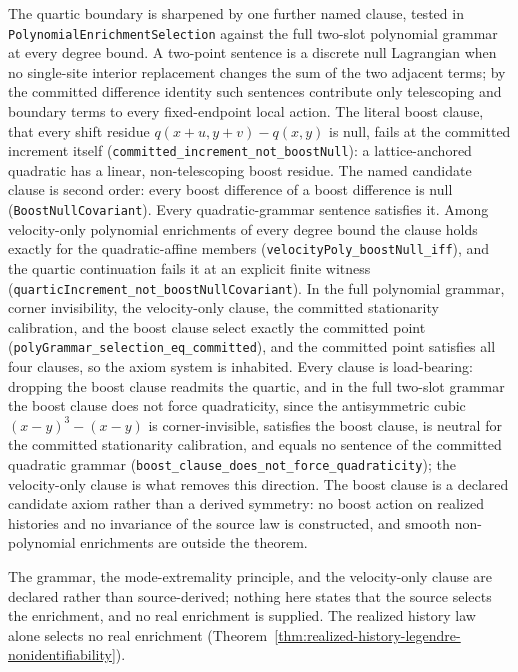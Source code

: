 \documentclass[11pt]{article}
\begin{document}
The quartic boundary is sharpened by one further named clause, tested in
\texttt{Polynomial\-Enrichment\-Selection} against the
full two-slot polynomial grammar at every degree bound. A two-point sentence is
a discrete null Lagrangian when no single-site interior replacement
changes the sum of the two adjacent terms; by the committed difference
identity such sentences contribute only telescoping and boundary terms to
every fixed-endpoint local action. The literal boost clause, that every
shift residue \(q(x+u,y+v)-q(x,y)\) is null, fails at the committed
increment itself (\texttt{committed\_increment\_not\_boostNull}): a
lattice-anchored quadratic has a linear, non-telescoping boost residue.
The named candidate clause is second order: every boost difference of a
boost difference is null (\texttt{BoostNullCovariant}). Every
quadratic-grammar sentence satisfies it. Among velocity-only polynomial
enrichments of every degree bound the clause holds exactly for the
quadratic-affine members (\texttt{velocityPoly\_boostNull\_iff}), and the
quartic continuation fails it at an explicit finite witness
(\texttt{quarticIncrement\_not\_boostNullCovariant}). In the full
polynomial grammar, corner invisibility, the velocity-only clause, the
committed stationarity calibration, and the boost clause select exactly
the committed point (\texttt{polyGrammar\_selection\_eq\_committed}), and
the committed point satisfies all four clauses, so the axiom system is
inhabited. Every clause is load-bearing: dropping the boost clause
readmits the quartic, and in the full two-slot grammar the boost clause
does not force quadraticity, since the antisymmetric cubic
\((x-y)^3-(x-y)\) is corner-invisible, satisfies the boost clause, is
neutral for the committed stationarity calibration, and equals no
sentence of the committed quadratic grammar
(\texttt{boost\_clause\_does\_not\_force\_quadraticity}); the
velocity-only clause is what removes this direction. The boost clause is
a declared candidate axiom rather than a derived symmetry: no boost action on realized histories and no invariance
of the source law is constructed, and smooth non-polynomial enrichments
are outside the theorem.

The grammar, the
mode-extremality principle, and the velocity-only clause are declared
rather than source-derived; nothing here states that the source selects
the enrichment, and no real enrichment is supplied. The realized history
law alone selects no real enrichment
(Theorem~\ref{thm:realized-history-legendre-nonidentifiability}).
\end{document}
